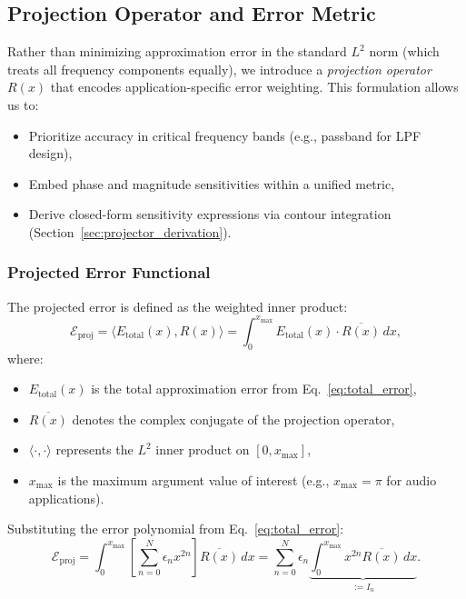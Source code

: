 \subsection{Projection Operator and Error Metric}
\label{sec:proj_operator}

Rather than minimizing approximation error in the standard $L^2$ norm (which treats all frequency components equally), we introduce a \emph{projection operator} $R(x)$ that encodes application-specific error weighting. This formulation allows us to:
\begin{itemize}
\item Prioritize accuracy in critical frequency bands (e.g., passband for LPF design),
\item Embed phase and magnitude sensitivities within a unified metric,
\item Derive closed-form sensitivity expressions via contour integration (Section~\ref{sec:projector_derivation}).
\end{itemize}

\subsubsection{Projected Error Functional}

The projected error is defined as the weighted inner product:
\begin{equation}
\mathcal{E}_{\text{proj}} = \langle E_{\text{total}}(x), R(x) \rangle = \int_{0}^{x_{\max}} E_{\text{total}}(x) \cdot \overline{R(x)} \, dx,
\label{eq:projected_error}
\end{equation}
where:
\begin{itemize}
\item $E_{\text{total}}(x)$ is the total approximation error from Eq.~\eqref{eq:total_error},
\item $\overline{R(x)}$ denotes the complex conjugate of the projection operator,
\item $\langle \cdot, \cdot \rangle$ represents the $L^2$ inner product on $[0, x_{\max}]$,
\item $x_{\max}$ is the maximum argument value of interest (e.g., $x_{\max} = \pi$ for audio applications).
\end{itemize}

Substituting the error polynomial from Eq.~\eqref{eq:total_error}:
\begin{equation}
\mathcal{E}_{\text{proj}} = \int_{0}^{x_{\max}} \left[\sum_{n=0}^{N} \epsilon_n x^{2n}\right] \overline{R(x)} \, dx = \sum_{n=0}^{N} \epsilon_n \underbrace{\int_{0}^{x_{\max}} x^{2n} \overline{R(x)} \, dx}_{:= I_n}.
\label{eq:proj_expansion}
\end{equation}

